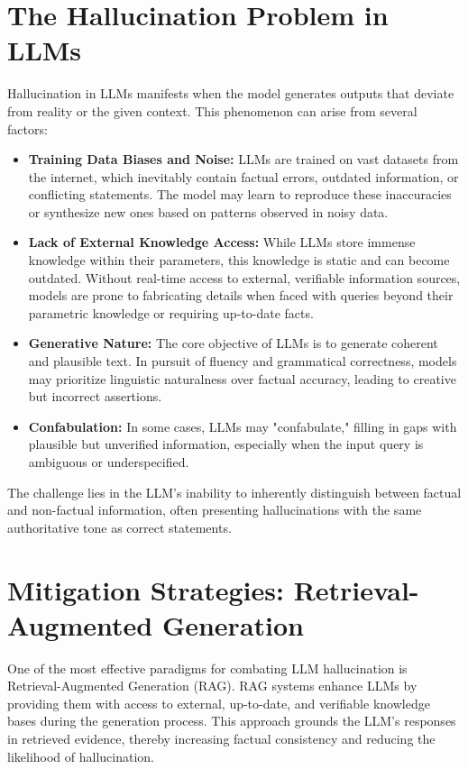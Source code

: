 \documentclass{article}
\begin{document}
\section{The Hallucination Problem in LLMs}
Hallucination in LLMs manifests when the model generates outputs that deviate from reality or the given context. This phenomenon can arise from several factors:
\begin{itemize}
    \item \textbf{Training Data Biases and Noise:} LLMs are trained on vast datasets from the internet, which inevitably contain factual errors, outdated information, or conflicting statements. The model may learn to reproduce these inaccuracies or synthesize new ones based on patterns observed in noisy data.
    \item \textbf{Lack of External Knowledge Access:} While LLMs store immense knowledge within their parameters, this knowledge is static and can become outdated. Without real-time access to external, verifiable information sources, models are prone to fabricating details when faced with queries beyond their parametric knowledge or requiring up-to-date facts.
    \item \textbf{Generative Nature:} The core objective of LLMs is to generate coherent and plausible text. In pursuit of fluency and grammatical correctness, models may prioritize linguistic naturalness over factual accuracy, leading to creative but incorrect assertions.
    \item \textbf{Confabulation:} In some cases, LLMs may "confabulate," filling in gaps with plausible but unverified information, especially when the input query is ambiguous or underspecified.
\end{itemize}
The challenge lies in the LLM's inability to inherently distinguish between factual and non-factual information, often presenting hallucinations with the same authoritative tone as correct statements.

\section{Mitigation Strategies: Retrieval-Augmented Generation}
One of the most effective paradigms for combating LLM hallucination is Retrieval-Augmented Generation (RAG). RAG systems enhance LLMs by providing them with access to external, up-to-date, and verifiable knowledge bases during the generation process. This approach grounds the LLM's responses in retrieved evidence, thereby increasing factual consistency and reducing the likelihood of hallucination.
\end{document}
